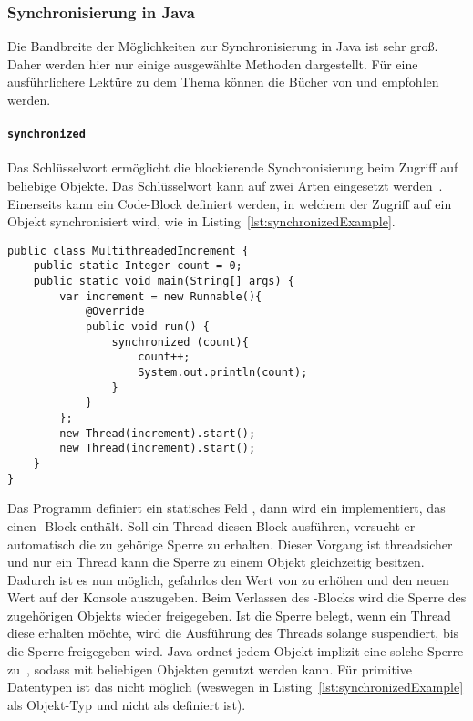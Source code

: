 \subsubsection{Synchronisierung in Java}
Die Bandbreite der Möglichkeiten zur Synchronisierung in Java ist sehr groß. Daher werden hier nur einige ausgewählte Methoden dargestellt. Für eine ausführlichere Lektüre zu dem Thema können die Bücher von \textcite{Friesen2015} und \textcite{Hettel2016} empfohlen werden.

\paragraph{\texttt{synchronized}} Das Schlüsselwort  ermöglicht die blockierende Synchronisierung beim Zugriff auf beliebige Objekte. Das Schlüsselwort kann auf zwei Arten eingesetzt werden~\Cite[S.~339~\psqq]{Rauber2006}. Einerseits kann ein Code-Block definiert werden, in welchem der Zugriff auf ein Objekt synchronisiert wird, wie in Listing~\ref{lst:synchronizedExample}.
\begin{lstlisting}[caption={[Beispiel eines Java-\glsentryuseri{Programm} mit Nutzung von \code{synchronized}.]Beispiel eines Java-\glsuseri{Programm}, das \code{synchronized} zur Synchronisierung nebenläufiger \glspl{Anweisung} nutzt.}, label={lst:synchronizedExample},float={htbp}]
public class MultithreadedIncrement {
	public static Integer count = 0;
	public static void main(String[] args) {
		var increment = new Runnable(){
			@Override
			public void run() {
				synchronized (count){
					count++;
					System.out.println(count);
				}
			}
		};
		new Thread(increment).start();
		new Thread(increment).start();
	}
}	
\end{lstlisting}
Das \gls{Programm} definiert ein statisches Feld , dann wird ein \classRunnable{} implementiert, das einen -Block enthält. Soll ein Thread diesen Block ausführen, versucht er automatisch die zu  gehörige Sperre zu erhalten. Dieser Vorgang ist threadsicher und nur ein Thread kann die Sperre zu einem Objekt gleichzeitig besitzen. Dadurch ist es nun möglich, gefahrlos den Wert von  zu erhöhen und den neuen Wert auf der Konsole auszugeben. Beim Verlassen des -Blocks wird die Sperre des zugehörigen Objekts wieder freigegeben. Ist die Sperre belegt, wenn ein Thread diese erhalten möchte, wird die Ausführung des Threads solange suspendiert, bis die Sperre freigegeben wird. Java ordnet jedem Objekt implizit eine solche Sperre zu~\cite{Friesen2015}, sodass  mit beliebigen Objekten genutzt werden kann. Für primitive Datentypen ist das nicht möglich (weswegen  in Listing~\ref{lst:synchronizedExample} als Objekt-Typ \classInteger{} und nicht als  definiert ist).

